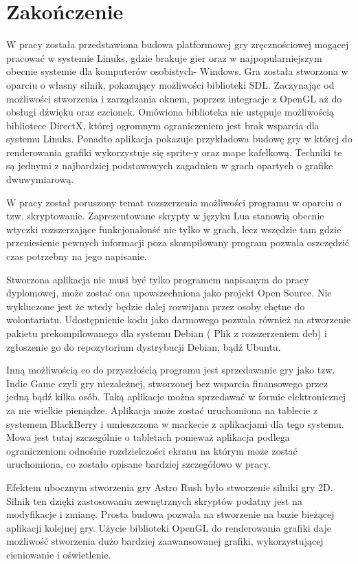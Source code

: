 \setcounter{secnumdepth}{-1}
\renewcommand{\chaptername}{}
\chapter{Zakończenie} 
\hspace{1cm} W pracy została przedstawiona budowa platformowej gry zręcznościowej mogącej pracować w systemie Linuks, gdzie brakuje gier oraz w najpopularniejszym obecnie systemie dla komputerów osobistych- Windows. 
Gra została stworzona w oparciu o własny silnik, pokazujący możliwości biblioteki SDL. Zaczynając od możliwości stworzenia i zarządzania oknem, poprzez integracje z OpenGL aż do obsługi dźwięku oraz czcionek. Omówiona biblioteka nie ustępuje możliwością bibliotece DirectX, której ogromnym ograniczeniem jest brak wsparcia dla systemu Linuks. Ponadto aplikacja pokazuje przykładowa budowę gry w której do renderowania grafiki wykorzystuje się sprite-y oraz mape kafelkową. Techniki te są jednymi z najbardziej podstawowych zagadnien w grach opartych o grafike dwuwymiarową.

W pracy został poruszony temat rozszerzenia możliwości programu w oparciu o tzw. skryptowanie. Zaprezentowane skrypty w języku Lua stanowią obecnie wtyczki rozszerzające funkcjonalonść nie tylko w grach, lecz wszędzie tam gdzie przeniesienie pewnych informacji poza skompilowany program pozwala oszczędzić czas potrzebny na jego napisanie.  

Stworzona aplikacja nie musi być tylko programem napisanym do pracy dyplomowej, może zostać ona upowszechniona jako projekt Open Source. Nie wykluczone jest że wtedy będzie dalej rozwijana przez osoby chętne do wolontariatu. Udostępnienie kodu jako darmowego pozwala również na stworzenie pakietu prekompilowanego dla systemu Debian ( Plik z rozszerzeniem deb) i zgłoszenie go do repozytorium dystrybucji Debian, bądź Ubuntu. 

Inną możliwością co do przyszłością programu jest sprzedawanie gry jako tzw. Indie Game czyli gry niezależnej, stworzonej bez wsparcia finansowego przez jedną bądź kilka osób. Taką aplikacje można sprzedawać w formie elektronicznej za nie wielkie pieniądze. Aplikacja może zostać uruchomiona na tablecie z systemem BlackBerry i umieszczona w markecie z aplikacjami dla tego systemu. Mowa jest tutaj szczególnie o tabletach ponieważ aplikacja podlega ograniczeniom odnośnie rozdzielczości ekranu na którym może zostać uruchomiona, co zostało opisane bardziej szczegółowo w pracy.  

Efektem ubocznym stworzenia gry Astro Rush było stworzenie silniki gry 2D. Silnik ten dzięki zastosowaniu zewnętrznych skryptów podatny jest na modyfikacje i zmianę. Prosta budowa pozwala na stworzenie na bazie bieżącej aplikacji kolejnej gry. Użycie biblioteki OpenGL do renderowania grafiki daje możliwość stworzenia dużo bardziej zaawansowanej grafiki, wykorzystującej cieniowanie i oświetlenie. 


